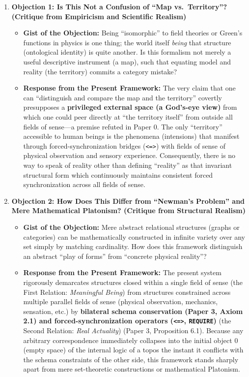 \documentclass[11pt,a4paper]{article}
\theoremstyle{definition}
\theoremstyle{plain}
\begin{document}
\begin{enumerate}
    \item \textbf{Objection 1: Is This Not a Confusion of ``Map vs.\ Territory''? (Critique from Empiricism and Scientific Realism)}
    \begin{itemize}
        \item \textbf{Gist of the Objection:} Being ``isomorphic'' to field theories or Green's functions in physics is one thing; the world itself \textit{being} that structure (ontological identity) is quite another. Is this formalism not merely a useful descriptive instrument (a map), such that equating model and reality (the territory) commits a category mistake?
        \item \textbf{Response from the Present Framework:} The very claim that one can ``distinguish and compare the map and the territory'' covertly presupposes a \textbf{privileged external space (a God's-eye view)} from which one could peer directly at ``the territory itself'' from outside all fields of sense---a premise refuted in Paper 0. The only ``territory'' accessible to human beings is the phenomena (intensions) that manifest through forced-synchronization bridges (\texttt{<=>}) with fields of sense of physical observation and sensory experience. Consequently, there is no way to speak of reality other than defining ``reality'' as that invariant structural form which continuously maintains consistent forced synchronization across all fields of sense.
    \end{itemize}

    \item \textbf{Objection 2: How Does This Differ from ``Newman's Problem'' and Mere Mathematical Platonism? (Critique from Structural Realism)}
    \begin{itemize}
        \item \textbf{Gist of the Objection:} Mere abstract relational structures (graphs or categories) can be mathematically constructed in infinite variety over any set simply by matching cardinality. How does this framework distinguish an abstract ``play of forms'' from ``concrete physical reality''?
        \item \textbf{Response from the Present Framework:} The present system rigorously demarcates structures closed within a single field of sense (the First Relation: \textit{Meaningful Being}) from structures constrained across multiple parallel fields of sense (physical observation, mechanics, sensation, etc.) by \textbf{bilateral schema conservation (Paper 3, Axiom 2.1) and forced-synchronization operators (\texttt{<=>}, \texttt{REQUIRE})} (the Second Relation: \textit{Real Actuality}) (Paper 3, Proposition 6.1). Because any arbitrary correspondence immediately collapses into the initial object $0$ (empty space) of the internal logic of a topos the instant it conflicts with the schema constraints of the other side, this framework stands sharply apart from mere set-theoretic constructions or mathematical Platonism.
    \end{itemize}


\end{enumerate}
\end{document}
